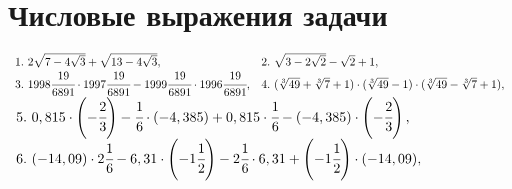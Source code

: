 \section{Числовые выражения задачи}
$\begin{array}{ll}
1.\ 2\sqrt{7-4\sqrt{3}}+\sqrt{13-4\sqrt{3}},&
2.\ \sqrt{3-2\sqrt{2}}-\sqrt{2}+1,\\
3.\ 1998\cfrac{19}{6891}\cdot1997\cfrac{19}{6891}-1999\cfrac{19}{6891}\cdot1996\cfrac{19}{6891},&
4.\ (\sqrt[3]{49}+\sqrt[3]{7}+1)\cdot(\sqrt[3]{49}-1)\cdot(\sqrt[3]{49}-\sqrt[3]{7}+1),
\end{array}$\\
$\begin{array}{l}
5.\ 0,815\cdot\left(-\cfrac{2}{3}\right)-\cfrac{1}{6}\cdot(-4,385)+0,815\cdot\cfrac{1}{6}-(-4,385)\cdot\left(-\cfrac{2}{3}\right),\\
6.\ (-14,09)\cdot 2\cfrac{1}{6}-6,31\cdot\left(-1\cfrac{1}{2}\right)-2\cfrac{1}{6}\cdot6,31+\left(-1\cfrac{1}{2}\right)\cdot(-14,09),
\end{array}$\\
